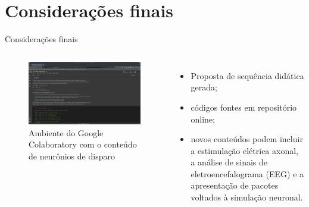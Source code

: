 \section{Considerações finais}
\begin{frame}{Considerações finais}
	\begin{columns}[t]
		\column{5cm}
			\begin{figure}[tb]
				\centering
				\caption{Ambiente do Google Colaboratory com o conteúdo de neurônios de disparo}
				\label{fig:colab}
				\includegraphics[width=\linewidth]{figs/colab}
			\end{figure}
		\column{5cm}
			\begin{itemize}
				\item Proposta de sequência didática gerada;
				\item códigos fontes em repositório online;
				\item novos conteúdos podem incluir a estimulação elétrica axonal, a análise de sinais de eletroencefalograma (EEG) e a apresentação de pacotes voltados à simulação neuronal.
			\end{itemize}
	\end{columns}
\end{frame}

